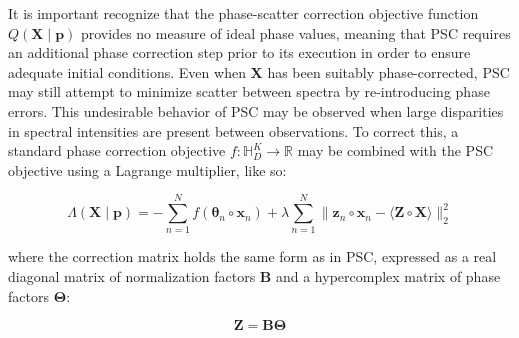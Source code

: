 \begin{doublespace}
It is important recognize that the phase-scatter correction objective function
$Q(\mathbf{X} \mid \mathbf{p})$ provides no measure of ideal phase values,
meaning that PSC requires an additional phase correction step prior to its
execution in order to ensure adequate initial conditions. Even when
$\mathbf{X}$ has been suitably phase-corrected, PSC may still attempt to
minimize scatter between spectra by re-introducing phase errors. This
undesirable behavior of PSC may be observed when large disparities in
spectral intensities are present between observations. To correct this,
a standard phase correction objective
$f : \mathbb{H}_D^{K} \to \mathbb{R}$ may be combined with
the PSC objective using a Lagrange multiplier, like so:

\begin{equation}
\Lambda(\mathbf{X} \mid \mathbf{p}) =
 -\sum_{n=1}^N f(\boldsymbol{\theta}_n \circ \mathbf{x}_n) +
 \lambda \sum_{n=1}^N \| \mathbf{z}_n \circ \mathbf{x}_n -
            \langle \mathbf{Z} \circ \mathbf{X} \rangle \|_2^2
\end{equation}

where the correction matrix holds the same form as in PSC, expressed as a
real diagonal matrix of normalization factors $\mathbf{B}$ and a hypercomplex
matrix of phase factors $\mathbf{\Theta}$:

\begin{equation}
\mathbf{Z} = \mathbf{B} \mathbf{\Theta}
\end{equation}


\end{doublespace}
